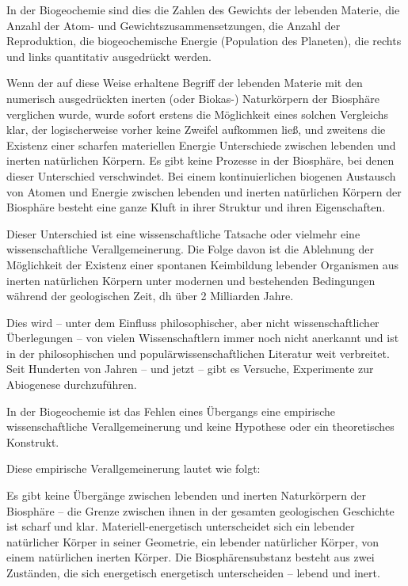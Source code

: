 \documentclass[11pt,a4paper]{book}
\begin{document}
In der Biogeochemie sind dies die Zahlen des Gewichts der lebenden Materie, die Anzahl der Atom- und Gewichtszusammensetzungen, die Anzahl der Reproduktion, die biogeochemische Energie (Population des Planeten), die rechts und links quantitativ ausgedrückt werden.



Wenn der auf diese Weise erhaltene Begriff der lebenden Materie mit den numerisch ausgedrückten inerten (oder Biokas-) Naturkörpern der Biosphäre verglichen wurde, wurde sofort erstens die Möglichkeit eines solchen Vergleichs klar, der logischerweise vorher keine Zweifel aufkommen ließ, und zweitens die Existenz einer scharfen materiellen Energie Unterschiede zwischen lebenden und inerten natürlichen Körpern. Es gibt keine Prozesse in der Biosphäre, bei denen dieser Unterschied verschwindet. Bei einem kontinuierlichen biogenen Austausch von Atomen und Energie zwischen lebenden und inerten natürlichen Körpern der Biosphäre besteht eine ganze Kluft in ihrer Struktur und ihren Eigenschaften.



Dieser Unterschied ist eine wissenschaftliche Tatsache oder vielmehr eine wissenschaftliche Verallgemeinerung. Die Folge davon ist die Ablehnung der Möglichkeit der Existenz einer spontanen Keimbildung lebender Organismen aus inerten natürlichen Körpern unter modernen und bestehenden Bedingungen während der geologischen Zeit, dh über 2 Milliarden Jahre.



Dies wird -- unter dem Einfluss philosophischer, aber nicht wissenschaftlicher Überlegungen -- von vielen Wissenschaftlern immer noch nicht anerkannt und ist in der philosophischen und populärwissenschaftlichen Literatur weit verbreitet. Seit Hunderten von Jahren -- und jetzt -- gibt es Versuche, Experimente zur Abiogenese durchzuführen.



In der Biogeochemie ist das Fehlen eines Übergangs eine empirische wissenschaftliche Verallgemeinerung und keine Hypothese oder ein theoretisches Konstrukt.



Diese empirische Verallgemeinerung lautet wie folgt:



Es gibt keine Übergänge zwischen lebenden und inerten Naturkörpern der Biosphäre -- die Grenze zwischen ihnen in der gesamten geologischen Geschichte ist scharf und klar. Materiell-energetisch unterscheidet sich ein lebender natürlicher Körper in seiner Geometrie, ein lebender natürlicher Körper, von einem natürlichen inerten Körper. Die Biosphärensubstanz besteht aus zwei Zuständen, die sich energetisch energetisch unterscheiden -- lebend und inert.
\end{document}
